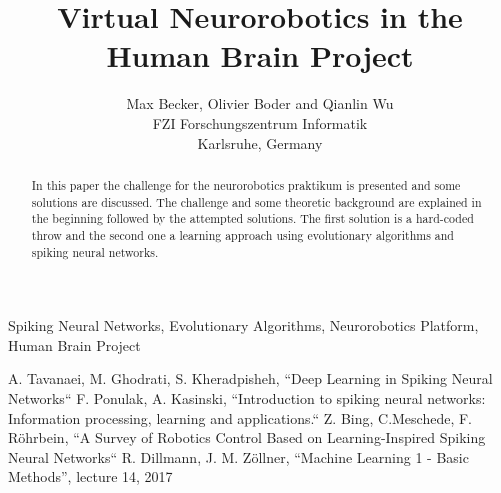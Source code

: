 \documentclass[conference]{IEEEtran}
\begin{document}
\title{Virtual Neurorobotics in the Human Brain Project}
\author{Max Becker, Olivier Boder and Qianlin Wu\\FZI Forschungszentrum Informatik\\Karlsruhe, Germany}

\maketitle
\thispagestyle{plain}
\pagestyle{plain}

\begin{abstract}
In this paper the challenge for the neurorobotics praktikum is presented and some solutions are discussed.
The challenge and some theoretic background are explained in the beginning followed by the attempted solutions.
The first solution is a hard-coded throw and the second one a learning approach using evolutionary algorithms and spiking neural networks.
\end{abstract}


\begin{IEEEkeywords}
Spiking Neural Networks, Evolutionary Algorithms, Neurorobotics Platform, Human Brain Project
\end{IEEEkeywords}












\begin{thebibliography}{00}
 A. Tavanaei, M. Ghodrati, S. Kheradpisheh, ``Deep Learning in Spiking Neural Networks``
 F. Ponulak, A. Kasinski, ``Introduction to spiking neural networks: Information processing, learning and applications.``
 Z. Bing, C.Meschede, F. R{\"o}hrbein, ``A Survey of Robotics Control Based on Learning-Inspired Spiking Neural Networks``
 R. Dillmann, J. M. Z{\"o}llner, ``Machine Learning 1 - Basic Methods'', lecture 14, 2017


\end{thebibliography}
\end{document}
